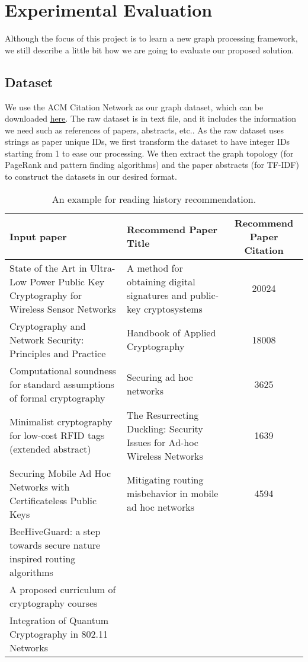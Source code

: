 \section{Experimental Evaluation}
%
Although the focus of this project is to learn a new graph processing framework, we still describe a little bit how we are going to evaluate our proposed solution.
%
\subsection{Dataset} \label{dataset}
%
We use the ACM Citation Network as our graph dataset, which can be downloaded \href{https://aminer.org/citation}{\underline{here}}.
%
The raw dataset is in text file, and it includes the information we need such as references of papers, abstracts, etc..
%
As the raw dataset uses strings as paper unique IDs, we first transform the dataset to have integer IDs starting from 1 to ease our processing.
%
We then extract the graph topology (for PageRank and pattern finding algorithms) and the paper abstracts (for TF-IDF) to construct the datasets in our desired format.
%
\begin{table*}[ht]
	\centering
	\begin{tabular}{p{6cm}p{6cm}c}
		\toprule
		\textbf{Input paper}		& \textbf{Recommend Paper Title} 		& \textbf{Recommend Paper Citation} 	\\ \midrule
		State of the Art in Ultra-Low Power Public Key Cryptography for Wireless Sensor Networks &A method for obtaining digital signatures and public-key cryptosystems	&20024\\
		Cryptography and Network Security: Principles and Practice				&Handbook of Applied Cryptography &18008\\
		Computational soundness for standard assumptions of formal cryptography				&Securing ad hoc networks &3625\\
		Minimalist cryptography for low-cost RFID tags (extended abstract)				&The Resurrecting Duckling: Security Issues for Ad-hoc Wireless Networks &1639\\
		Securing Mobile Ad Hoc Networks with Certificateless Public Keys				&Mitigating routing misbehavior in mobile ad hoc networks&4594\\
		BeeHiveGuard: a step towards secure nature inspired routing algorithms\\
		A proposed curriculum of cryptography courses\\
		Integration of Quantum Cryptography in 802.11 Networks\\
		\bottomrule
	\end{tabular}
	\vspace{3mm}
	\caption{An example for reading history recommendation. }
	\label{res:patternexp}
\end{table*}
%
